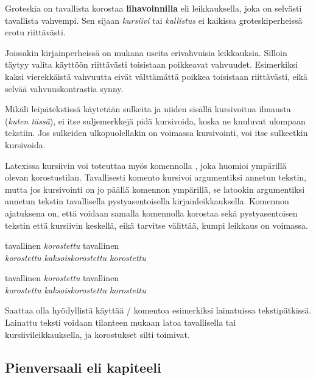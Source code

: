 \begin{tulossis}
  \sffamily Groteskia on tavallista korostaa \textbf{lihavoinnilla} eli
  leikkauksella, joka on selvästi tavallista vahvempi. Sen sijaan
  \textit{kursiivi} tai \textsl{kallistus} ei kaikissa groteskiperheissä
  erotu riittävästi.
\end{tulossis}

Joissakin kirjainperheissä on mukana useita erivahvuisia leikkauksia.
Silloin täytyy valita käyttöön riittävästi toisistaan poikkeavat
vahvuudet. Esimerkiksi kaksi vierekkäistä vahvuutta eivät välttämättä
poikkea toisistaan riittävästi, eikä selvää vahvuuskontrastia synny.

Mikäli leipätekstissä käytetään sulkeita ja niiden sisällä kursivoitua
ilmausta (\textit{kuten tässä}), ei itse suljemerkkejä pidä kursivoida,
koska ne kuuluvat ulompaan tekstiin. Jos sulkeiden ulkopuolellakin on
voimassa kursivointi, voi itse sulkeetkin kursivoida.

Latexissa kursiivin voi toteuttaa myös komennolla , joka
huomioi ympärillä olevan korostustilan. Tavallisesti komento kursivoi
argumentiksi annetun tekstin, mutta jos kursivointi on jo päällä
komennon ympärillä, se latookin argumentiksi annetun tekstin
tavallisella pystyasentoisella kirjainleikkauksella. Komennon ajatuksena
on, että voidaan samalla komennolla korostaa sekä pystyasentoisen
tekstin että kursiivin keskellä, eikä tarvitse välittää, kumpi leikkaus
on voimassa.

\begin{koodilohkosis}
tavallinen \emph{korostettu} tavallinen \\
\emph{korostettu \emph{kaksoiskorostettu} korostettu}
\end{koodilohkosis}

\begin{tulossis}
  tavallinen \emph{korostettu} tavallinen \\
  \emph{korostettu \emph{kaksoiskorostettu} korostettu}
\end{tulossis}

Saattaa olla hyödyllistä käyttää \-/ komentoa esimerkiksi
lainatuissa tekstipätkissä. Lainattu teksti voidaan tilanteen mukaan
latoa tavallisella tai kursiivileikkauksella, ja korostukset silti
toimivat.

\subsection{Pienversaali eli kapiteeli}
\label{luku:korostus_pienversaali}

